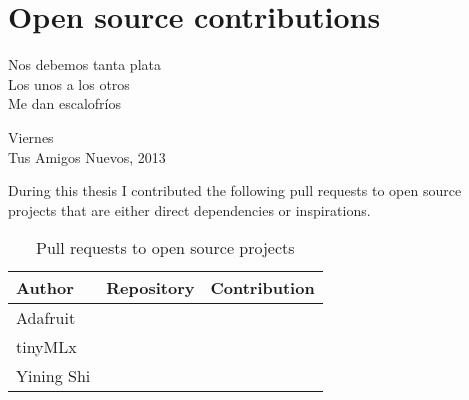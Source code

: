 \chapter{Open source contributions}

\epigraph{Nos debemos tanta plata \\ Los unos a los otros \\ Me dan escalofríos}{Viernes \\ Tus Amigos Nuevos, 2013}

During this thesis I contributed the following pull requests to open source projects that are either direct dependencies or inspirations.

\begin{table}[ht]
    \centering
    \begin{tabular}{ | l | l | l |}
        \hline
        Author & Repository & Contribution \\
        \hline
        Adafruit & \cite[Adafruit{\_}SSD1306]{repository-adafruit-adafruit_ssd1306} & \cite[Format binary numbers]{pull-request-adafruit-adafruit_ssd1306} \\
        \hline
        tinyMLx & \cite[TinyMLx Arduino Library]{repository-tinymlx-arduino-library} & \cite[Update architecture name]{pull-request-tinymlx-arduino-library} \\
        \hline
        Yining Shi & \cite[ML for Physical Computing]{repository-yining1023-machine-learning-for-physical-computing} & \cite[Fixed some typos]{pull-request-yining1023-machine-learning-for-physical-computing} \\
        \hline
    \end{tabular}
    \caption{Pull requests to open source projects}
    \label{table:open-source-pull-requests}
\end{table}{}
